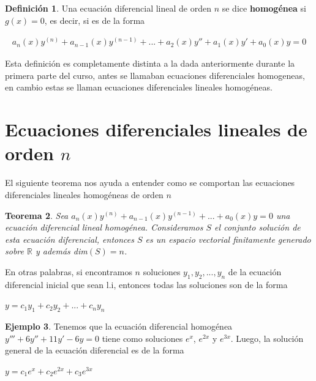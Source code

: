 \documentclass{article}
\theoremstyle{plain}
\newtheorem{thm}{Teorema}[section]
\theoremstyle{definition}
\newtheorem{defin}[thm]{Definición}
\newtheorem{ejem}[thm]{Ejemplo}
\begin{document}
\begin{defin}Una ecuación diferencial lineal de orden $n$ se dice \textbf{homog\'enea} si $g(x)=0$, es decir, si es de la forma
\end{defin}

\begin{align*}
a_n(x)y^{(n)} + a_{n-1}(x)y^{(n-1)}+ ... + a_2(x)y''+a_1(x)y' +a_0(x)y =0
\end{align*}

Esta definición es completamente distinta a la dada anteriormente durante la primera parte del curso, antes se llamaban ecuaciones diferenciales homogeneas, en cambio estas se llaman ecuaciones diferenciales lineales homog\'eneas.




\newpage

\section{Ecuaciones diferenciales lineales de orden $n$}


El siguiente teorema nos ayuda a entender como se comportan las ecuaciones diferenciales lineales homog\'eneas de orden $n$ \\

\begin{thm}Sea $a_n(x)y^{(n)} + a_{n-1}(x)y^{(n-1)}+ ... +a_0(x)y =0$ una ecuación diferencial lineal homog\'enea. Consideramos $S$ el conjunto solución de esta ecuación diferencial, entonces $S$ es un espacio vectorial finitamente generado sobre $\mathbb{R}$ y además  dim$(S) = n$. \\
\end{thm}


En otras palabras, si encontramos $n$ soluciones $y_1,y_2, ... , y_n$  de la ecuación diferencial inicial que sean l.i, entonces todas las soluciones son de la forma

\begin{center}
$y = c_1y_1+c_2y_2+ ...+ c_n y_n$
\end{center}

\begin{ejem}Tenemos que la ecuación diferencial homog\'enea $y'''+6y''+11y'-6y =0$ tiene como soluciones $e^x$, $e^{2x}$ y $e^{3x}$. Luego, la solución general de la ecuación diferencial es de la forma
\end{ejem}

\begin{center}
$y = c_1e^x +c_2e^{2x}+c_3e^{3x}$
\end{center}
\end{document}
